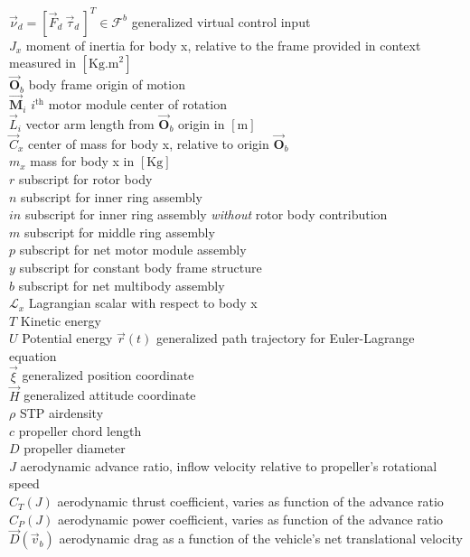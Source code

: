 \documentclass[a4paper, 11pt, oneside, openright, parskip=full]{book}
\begin{document}
$\vec{\nu}_d=[\vec{F}_d~\vec{\tau}_d\hspace{2pt}]^T\in\mathcal{F}^b$ generalized virtual control input\\
$J_x$ moment of inertia for body x, relative to the frame provided in context measured in $[\text{Kg.m}^{2}]$\\
$\vec{\mathbf{O}}_b$ body frame origin of motion\\
$\vec{\mathbf{M}}_i$ $i^\text{th}$ motor module center of rotation\\
$\vec{L}_i$ vector arm length from $\vec{\mathbf{O}}_b$ origin in $[\text{m}]$\\
$\vec{C}_x$ center of mass for body x, relative to origin $\vec{\mathbf{O}}_b$\\
$m_x$ mass for body x in $[\text{Kg}]$\\
$r$ subscript for rotor body\\
$n$ subscript for inner ring assembly\\
$in$ subscript for inner ring assembly \emph{without} rotor body contribution\\
$m$ subscript for middle ring assembly\\
$p$ subscript for net motor module assembly\\
$y$ subscript for constant body frame structure\\
$b$ subscript for net multibody assembly\\
$\mathcal{L}_x$ Lagrangian scalar with respect to body x\\
$T$ Kinetic energy\\
$U$ Potential energy
$\vec{r}(t)$ generalized path trajectory for Euler-Lagrange equation\\
$\vec{\xi}$ generalized position coordinate\\
$\vec{H}$ generalized attitude coordinate\\
$\rho$ STP airdensity\\
$c$ propeller chord length\\
$D$ propeller diameter\\
$J$ aerodynamic advance ratio, inflow velocity relative to propeller's rotational speed\\
$C_T(J)$ aerodynamic thrust coefficient, varies as function of the advance ratio\\
$C_P(J)$ aerodynamic power coefficient, varies as function of the advance ratio\\
$\vec{D}(\vec{v}_b)$ aerodynamic drag as a function of the vehicle's net translational velocity
\tableofcontents
\end{document}
